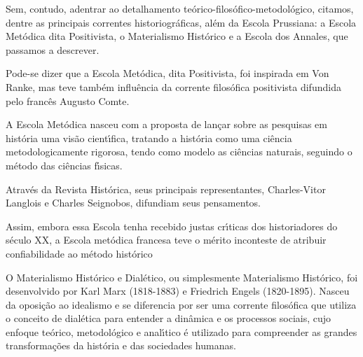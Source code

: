 \documentclass[
12pt,		%
openright,	%
twoside,  %
a4paper,			%
chapter=TITLE,		%
english,			%
french,				%
spanish,			%
brazil				%
]{USPSC-classe/USPSC}
\begin{document}
Sem, contudo, adentrar ao detalhamento te\'orico-filos\'ofico-metodol\'ogico, citamos, dentre as principais correntes historiogr\'aficas, al\'em da Escola Prussiana: a Escola Met\'odica dita Positivista, o Materialismo Hist\'orico e a Escola dos Annales, que passamos a descrever.




Pode-se dizer que a Escola Met\'odica, dita Positivista, foi inspirada em Von Ranke, mas teve tamb\'em influ\^encia da corrente filos\'ofica positivista difundida pelo franc\^es Augusto Comte.




A Escola Met\'odica nasceu com a proposta de  lan\c{c}ar sobre as pesquisas em hist\'oria uma vis\~ao cient\'{\i}fica, tratando a hist\'oria como uma ci\^encia metodologicamente rigorosa, tendo como modelo as ci\^encias naturais, seguindo o m\'etodo das ci\^encias f\'{\i}sicas.




Atrav\'es da Revista Hist\'orica, seus principais representantes, Charles-Vitor Langlois e Charles Seignobos, difundiam seus pensamentos.





\noindent\begin{center}\mbox{\centering{}}\end{center}


Assim, embora essa Escola tenha recebido justas cr\'{\i}ticas dos historiadores do s\'eculo XX, a Escola met\'odica francesa teve o m\'erito inconteste de atribuir confiabilidade ao m\'etodo hist\'orico




O Materialismo Hist\'orico e Dial\'etico, ou simplesmente Materialismo Hist\'orico, foi desenvolvido  por Karl Marx (1818-1883) e Friedrich Engels (1820-1895). Nasceu da oposi\c{c}\~ao ao idealismo e se diferencia por ser uma corrente filos\'ofica que utiliza o conceito de dial\'etica para entender a din\^amica e os processos sociais, cujo enfoque te\'orico, metodol\'ogico e anal\'{\i}tico \'e utilizado para compreender as grandes transforma\c{c}\~oes da hist\'oria e das sociedades humanas.
\end{document}
